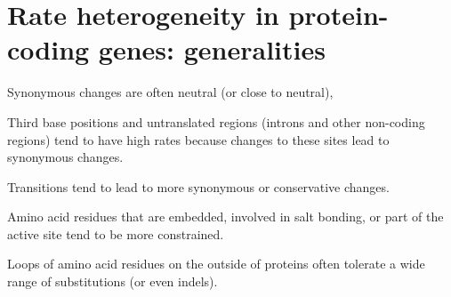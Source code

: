 \documentclass[landscape]{foils}
\begin{document}
\myNewSlide
\section*{Rate heterogeneity in protein-coding genes: generalities}
\large
\begin{compactitem}
	\item Synonymous changes are often neutral (or close to neutral),
	\item Third base positions and untranslated regions (introns and other non-coding regions) tend to have high rates because changes to these sites lead to synonymous changes.
	\item Transitions tend to lead to more synonymous or conservative changes.
	\item Amino acid residues that are embedded, involved in salt bonding, or part of the active site tend to be more constrained.
	\item Loops of amino acid residues on the outside of proteins often tolerate a wide range of substitutions (or even indels).
\end{compactitem}
\myNewSlide
\normalsize
\end{document}
